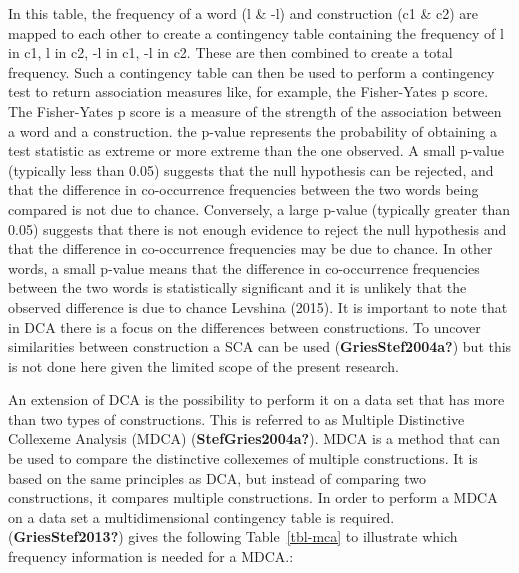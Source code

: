 \documentclass[
  letterpaper,
  DIV=11,
  numbers=noendperiod]{scrartcl}
\begin{document}
In this table, the frequency of a word (l \& -l) and construction (c1 \&
c2) are mapped to each other to create a contingency table containing
the frequency of l in c1, l in c2, -l in c1, -l in c2. These are then
combined to create a total frequency. Such a contingency table can then
be used to perform a contingency test to return association measures
like, for example, the Fisher-Yates p score. The Fisher-Yates p score is
a measure of the strength of the association between a word and a
construction. the p-value represents the probability of obtaining a test
statistic as extreme or more extreme than the one observed. A small
p-value (typically less than 0.05) suggests that the null hypothesis can
be rejected, and that the difference in co-occurrence frequencies
between the two words being compared is not due to chance. Conversely, a
large p-value (typically greater than 0.05) suggests that there is not
enough evidence to reject the null hypothesis and that the difference in
co-occurrence frequencies may be due to chance. In other words, a small
p-value means that the difference in co-occurrence frequencies between
the two words is statistically significant and it is unlikely that the
observed difference is due to chance Levshina (2015). It is important to
note that in DCA there is a focus on the differences between
constructions. To uncover similarities between construction a SCA can be
used (\textbf{GriesStef2004a?}) but this is not done here given the
limited scope of the present research.

An extension of DCA is the possibility to perform it on a data set that
has more than two types of constructions. This is referred to as
Multiple Distinctive Collexeme Analysis (MDCA)
(\textbf{StefGries2004a?}). MDCA is a method that can be used to compare
the distinctive collexemes of multiple constructions. It is based on the
same principles as DCA, but instead of comparing two constructions, it
compares multiple constructions. In order to perform a MDCA on a data
set a multidimensional contingency table is required.
(\textbf{GriesStef2013?}) gives the following Table~\ref{tbl-mca} to
illustrate which frequency information is needed for a MDCA.:
\end{document}
